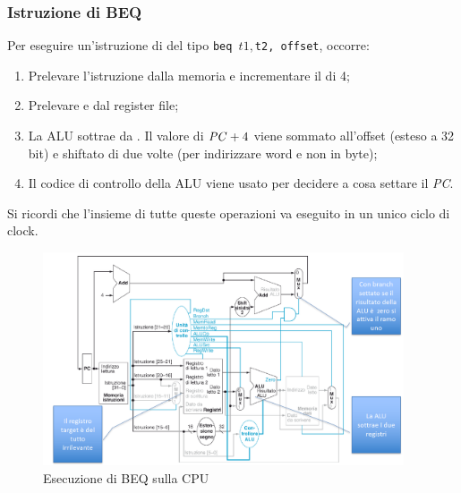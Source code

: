 \documentclass[class=book, crop=false, oneside]{standalone}
\begin{document}
\subsubsection{Istruzione di BEQ}
Per eseguire un'istruzione di  del tipo \texttt{beq $t1, $t2, offset}, occorre:
\begin{enumerate}
	\item Prelevare l’istruzione dalla memoria e incrementare il  di 4;
	\item Prelevare  e  dal register file;
	\item La ALU sottrae  da . Il valore di \(\textrm{\emph{PC}}+4\) viene sommato all’offset (esteso a 32 bit) e shiftato di due volte (per indirizzare word e non in byte);
	\item Il codice di controllo  della ALU viene usato per decidere a cosa settare il \emph{PC}.
\end{enumerate}
Si ricordi che l'insieme di tutte queste operazioni va eseguito in un unico ciclo di clock.

\begin{figure}[H]
	\centering
	\includegraphics[width=0.95\textwidth,keepaspectratio]{es_beq.png}
	\caption{Esecuzione di BEQ sulla CPU}
\end{figure}
\end{document}
